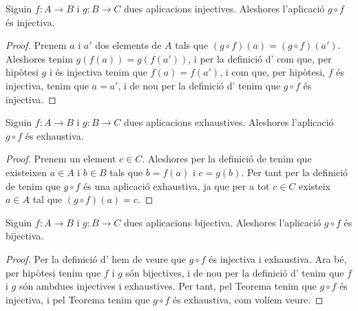 \documentclass[../Apunts.tex]{subfiles}
\begin{document}
	\begin{theorem}
		\label{thm:composició d'injectives injectiva}
		Siguin \(f\colon A\rightarrow B\) i \(g\colon B\rightarrow C\) dues aplicacions injectives. Aleshores l'aplicació \(g\circ f\) és injectiva.
		\begin{proof}
			Prenem \(a\) i \(a'\) dos elements de \(A\) tals que \((g\circ f)(a)=(g\circ f)(a')\). Aleshores tenim \(g(f(a))=g(f(a'))\), i per la definició d' com que, per hipòtesi \(g\) i és injectiva tenim que \(f(a)=f(a')\), i com que, per hipòtesi, \(f\) és injectiva, tenim que \(a=a'\), i de nou per la definició d' tenim que \(g\circ f\) és injectiva.
		\end{proof}
	\end{theorem}
	\begin{theorem}
		\label{thm:composició d'exhaustives exhaustiva}
		Siguin \(f\colon A\rightarrow B\) i \(g\colon B\rightarrow C\) dues aplicacions exhaustives. Aleshores l'aplicació \(g\circ f\) és exhaustiva.
		\begin{proof}
			Prenem un element \(c\in C\). Aleshores per la definició de  tenim que existeixen \(a\in A\) i \(b\in B\) tals que \(b=f(a)\) i \(c=g(b)\). Per tant per la definició de  tenim que \(g\circ f\) és una aplicació exhaustiva, ja que per a tot \(c\in C\) existeix \(a\in A\) tal que \((g\circ f)(a)=c\).
		\end{proof}
	\end{theorem}
	\begin{theorem}
		\label{thm:composició de bijectives bijectiva}
		Siguin \(f\colon A\rightarrow B\) i \(g\colon B\rightarrow C\) dues aplicacions bijectiva. Aleshores l'aplicació \(g\circ f\) és bijectiva.
		\begin{proof}
			Per la definició d' hem de veure que \(g\circ f\) és injectiva i exhaustiva. Ara bé, per hipòtesi tenim que \(f\) i \(g\) són bijectives, i de nou per la definició d' tenim que \(f\) i \(g\) són ambdues injectives i exhaustives. Per tant, pel Teorema  tenim que \(g\circ f\) és injectiva, i pel Teorema  tenim que \(g\circ f\) és exhaustiva, com volíem veure.
		\end{proof}
	\end{theorem}
\end{document}
